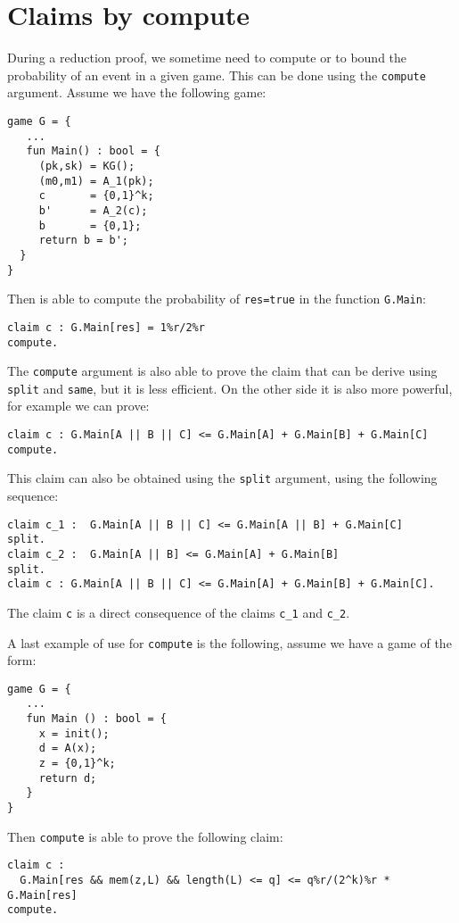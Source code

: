 \section{Claims by compute}

During a reduction proof, we sometime need to compute or to bound
the probability of an event in a given game. This can be done using
the \verb+compute+ argument. Assume we have the following game:
\begin{verbatim}
game G = { 
   ...
   fun Main() : bool = {
     (pk,sk) = KG();
     (m0,m1) = A_1(pk);
     c       = {0,1}^k;
     b'      = A_2(c);
     b       = {0,1};
     return b = b';
  }
} 
\end{verbatim}
Then \easycrypt is able to compute the probability of \verb+res=true+
in the function \verb+G.Main+:
\begin{verbatim}
claim c : G.Main[res] = 1%r/2%r 
compute.
\end{verbatim} 

The \verb+compute+ argument is also able to prove the claim that can be
derive using \verb+split+ and \verb+same+, but it is less efficient.
On the other side it is also more powerful, for example we can prove:
\begin{verbatim}
claim c : G.Main[A || B || C] <= G.Main[A] + G.Main[B] + G.Main[C]
compute.  
\end{verbatim}
This claim can also be obtained using the \verb+split+ argument, using
the following sequence:
\begin{verbatim}
claim c_1 :  G.Main[A || B || C] <= G.Main[A || B] + G.Main[C]
split.
claim c_2 :  G.Main[A || B] <= G.Main[A] + G.Main[B]
split.
claim c : G.Main[A || B || C] <= G.Main[A] + G.Main[B] + G.Main[C]. 
\end{verbatim}
The claim \verb+c+ is a direct consequence of the claims \verb+c_1+ and 
\verb+c_2+.

A last example of use for \verb+compute+ is the following, assume
we have a game of the form:
\begin{verbatim}
game G = { 
   ...
   fun Main () : bool = {
     x = init();
     d = A(x);
     z = {0,1}^k;
     return d;
   }
}     
\end{verbatim}
Then \verb+compute+ is able to prove the following claim:
\begin{verbatim}
claim c :
  G.Main[res && mem(z,L) && length(L) <= q] <= q%r/(2^k)%r * G.Main[res]
compute.
\end{verbatim}

